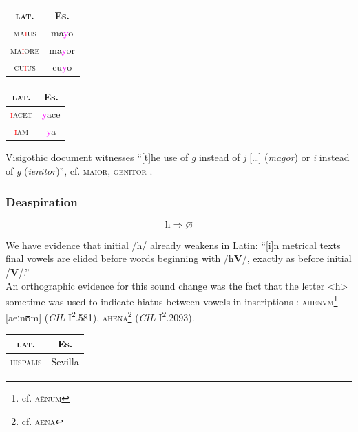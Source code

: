 \documentclass{report}[12pt]
\begin{document}
\begin{tabular}{c c}
  \textsc{lat.} & Es. \\
  \hline
  \textsc{ma\textcolor{red}{i}us} & ma\textcolor{magenta}{y}o \\
  \textsc{ma\textcolor{red}{i}ore} & ma\textcolor{magenta}{y}or \\
  \textsc{cu\textcolor{red}{i}us} & cu\textcolor{magenta}{y}o \\
\end{tabular}

\begin{tabular}{c c}
  \textsc{lat.} & Es. \\
  \hline
  \textsc{\textcolor{red}{i}acet} & \textcolor{magenta}{y}ace \\
  \textsc{\textcolor{red}{i}am} & \textcolor{magenta}{y}a \\
\end{tabular}

Visigothic document witnesses ``[t]he use of \emph{g} instead of \emph{j} [\dots] (\emph{magor}) or \emph{i} instead of \emph{g} (\emph{ienitor})'', cf. \textsc{maior}, \textsc{genitor} \parencite[p.~159]{latin_palaeography}.

\subsubsection*{Deaspiration}

\begin{tcolorbox}
  \[ \text{h} \Rightarrow \varnothing \]
\end{tcolorbox}

We have evidence that initial /h/ already weakens in Latin: ``[i]n metrical texts final vowels are elided before words beginning with /h\textbf{V}/, exactly as before initial /\textbf{V}/.'' \parencite[p.~87]{companion_to_latin} \\
An orthographic evidence for this sound change was the fact that the letter <h> sometime was used to indicate hiatus between vowels in inscriptions \parencite[p.~18]{companion_to_latin}: \textsc{ahenvm}\footnote{cf. \textsc{a\={e}num}} [aeːnʊm] (\emph{CIL} I\textsuperscript{2}.581), \textsc{ahena}\footnote{cf. \textsc{a\={e}na}} (\emph{CIL} I\textsuperscript{2}.2093).

\begin{tabular}{c c}
  \textsc{lat.} & Es. \\
  \hline
  \textsc{hispalis} & Sevilla
\end{tabular}
\end{document}
